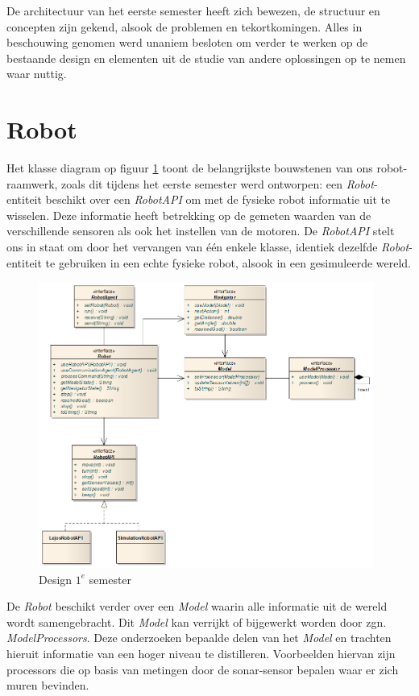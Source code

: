 \documentclass[12pt,a4paper]{report}
\begin{document}
De architectuur van het eerste semester heeft zich bewezen, de structuur en concepten zijn gekend, alsook de problemen en tekortkomingen. Alles in beschouwing genomen werd unaniem besloten om verder te werken op de bestaande design en elementen uit de studie van andere oplossingen op te nemen waar nuttig.

\section{Robot}

Het klasse diagram op figuur \ref{uml:design-semester1} toont de belangrijkste bouwstenen van ons robot-raamwerk, zoals dit tijdens het eerste semester werd ontworpen: een \emph{Robot}-entiteit beschikt over een \emph{RobotAPI} om met de fysieke robot informatie uit te wisselen. Deze informatie heeft betrekking op de gemeten waarden van de verschillende sensoren als ook het instellen van de motoren. De \emph{RobotAPI} stelt ons in staat om door het vervangen van \'e\'en enkele klasse, identiek dezelfde \emph{Robot}-entiteit te gebruiken in een echte fysieke robot, alsook in een gesimuleerde wereld.

\begin{figure}[htbp]
  \centering
  \includegraphics[width=110mm]{resources/design-semester1.png}
  \caption{Design $1^e$ semester}
  \label{uml:design-semester1}
\end{figure}

De \emph{Robot} beschikt verder over een \emph{Model} waarin alle informatie uit de wereld wordt samengebracht. Dit \emph{Model} kan verrijkt of bijgewerkt worden door zgn. \emph{ModelProcessors}. Deze onderzoeken bepaalde delen van het \emph{Model} en trachten hieruit informatie van een hoger niveau te distilleren. Voorbeelden hiervan zijn processors die op basis van metingen door de sonar-sensor bepalen waar er zich muren bevinden.
\end{document}
